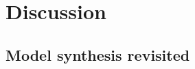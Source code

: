 \section{Discussion\label{section:background-discussion}}

\subsection{Model synthesis revisited}



